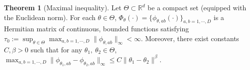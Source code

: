\documentclass[11pt]{article}
\numberwithin{equation}{section}
\theoremstyle{plain}
\theoremstyle{definition}
\theoremstyle{definition}
\theoremstyle{assumption}
\theoremstyle{proposition}
\theoremstyle{proposition}
\theoremstyle{example}
\theoremstyle{lemma}
\theoremstyle{theorem}
\newtheorem{theorem}{Theorem}[section]
\theoremstyle{remark}
\begin{document}
\begin{theorem}[Maximal inequality]\label{stochastic_conv_rate_thm}
Let $\Theta\subset \mathbb{R}^d$ be a compact set (equipped with the Euclidean norm). For each $\theta\in\Theta$, $\Phi_{\theta}(\cdot)=\{\phi_{\theta,ab}(\cdot)\}_{a,b=1,\cdots,D}$ is a Hermitian matrix of continuous, bounded functions satisfying $\tau_0:=\sup_{\theta\in\Theta}\max_{a,b=1,\cdots,D}\|\phi_{\theta,ab}\|_{\infty}< \infty$. Moreover, there exist constants $C,\beta>0$ such that for any $\theta_1,~\theta_2\in\Theta$, $\max_{a,b=1,\cdots,D}\|\phi_{\theta_1, ab} - \phi_{\theta_2, ab}\|_{\infty} \leqslant C\|\theta_1 - \theta_2\|^{\beta}$.




\end{theorem}
\end{document}
